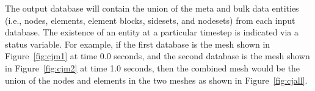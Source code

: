 The output database will contain the union of the meta and bulk data
entities (i.e., nodes, elements, element blocks, sidesets, and
nodesets) from each input database. The existence of an entity at a
particular timestep is indicated via a status variable.  For example,
if the first database is the mesh shown in Figure~\ref{fig:cjm1} at
time 0.0 seconds, and the second database is the mesh shown in
Figure~\ref{fig:cjm2} at time 1.0 seconds, then the combined mesh
would be the union of the nodes and elements in the two meshes as
shown in Figure~\ref{fig:cjall}.
\begin{figure}[htp]
\centering
{}

\end{figure}
